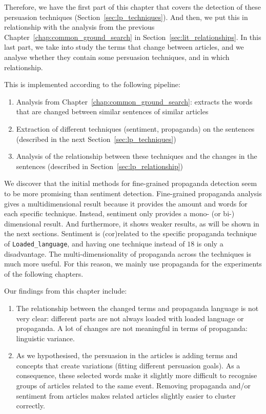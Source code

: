 Therefore, we have the first part of this chapter that covers the detection of these persuasion techniques (Section~\ref{sec:lp_techniques}).
And then, we put this in relationship with the analysis from the previous Chapter~\ref{chap:common_ground_search} in Section~\ref{sec:lit_relationships}.
In this last part, 
we take into study the terms that change between articles, and we analyse whether they contain some persuasion techniques, and in which relationship. %

This is implemented according to the following pipeline:
\begin{enumerate}
    \item Analysis from Chapter~\ref{chap:common_ground_search}: extracts the words that are changed between similar sentences of similar articles
    \item Extraction of different techniques (sentiment, propaganda) on the sentences (described in the next Section~\ref{sec:lp_techniques})
    \item Analysis of the relationship between these techniques and the changes in the sentences (described in Section~\ref{sec:lp_relationship})
\end{enumerate}


We discover that
the initial methods for fine-grained propaganda detection seem to be more promising %
than sentiment detection.
Fine-grained propaganda analysis gives a multidimensional result because it provides the amount and words for each specific technique. Instead, sentiment only provides a mono- (or bi-) dimensional result. And furthermore, it shows weaker results, as will be shown in the next sections.
Sentiment is (cor)related to the specific propaganda technique of \texttt{Loaded\_language}, and having one technique instead of $18$ is only a disadvantage.
The multi-dimensionality of propaganda across the techniques is much more useful.
For this reason, we mainly use propaganda for the experiments of the following chapters. 

Our findings from this chapter include:
\begin{enumerate}
    \item The relationship between the changed terms and propaganda language is not very clear: different parts are not always loaded with loaded language or propaganda. A lot of changes are not meaningful in terms of propaganda: linguistic variance.
    \item As we hypothesised, the persuasion in the articles is adding terms and concepts that create variations (fitting different persuasion goals). As a consequence, these selected words make it slightly more difficult to recognise groups of articles related to the same event.
    Removing propaganda and/or sentiment from articles makes related articles slightly easier to cluster correctly.
\end{enumerate}


